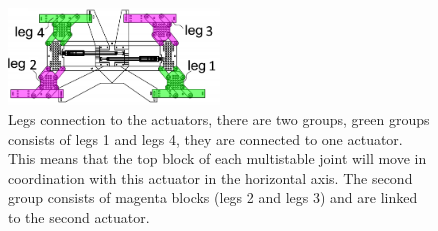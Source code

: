         \begin{figure}
            \centering
            \includegraphics[width=0.5\textwidth]{images/legs_connection.png}
            \caption{Legs connection to the actuators, there are two groups, green groups consists of legs 1 and legs 4, they are connected to one actuator. This means that the top block of each multistable joint will move in coordination with this actuator in the horizontal axis. The second group consists of magenta blocks (legs 2 and legs 3) and are linked to the second actuator.}
            \label{fig:legs_connection}
        \end{figure}